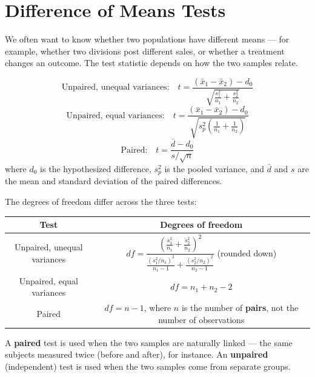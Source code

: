 \documentclass[
  11pt,
  letterpaper,
  DIV=11,
  numbers=noendperiod,
  oneside,
  open=any]{scrreprt}
\begin{document}
\section{Difference of Means Tests}\label{difference-of-means-tests}

We often want to know whether two populations have different means ---
for example, whether two divisions post different sales, or whether a
treatment changes an outcome. The test statistic depends on how the two
samples relate.

\begin{bsformula}

\[\text{Unpaired, unequal variances:} \quad t = \frac{(\bar{x}_1 - \bar{x}_2) - d_0}{\sqrt{\frac{s_1^2}{n_1} + \frac{s_2^2}{n_2}}}\]
\[\text{Unpaired, equal variances:} \quad t = \frac{(\bar{x}_1 - \bar{x}_2) - d_0}{\sqrt{s_p^2\left(\frac{1}{n_1} + \frac{1}{n_2}\right)}}\]
\[\text{Paired:} \quad t = \frac{\bar{d} - d_0}{s / \sqrt{n}}\] where
\(d_0\) is the hypothesized difference, \(s_p^2\) is the pooled
variance, and \(\bar{d}\) and \(s\) are the mean and standard deviation
of the paired differences.

The degrees of freedom differ across the three tests:

\begin{center}
\begin{tabular}{cc}
\toprule
Test & Degrees of freedom \\
\midrule
Unpaired, unequal variances & \(df = \dfrac{\left(\frac{s_1^2}{n_1} + \frac{s_2^2}{n_2}\right)^2}{\frac{(s_1^2/n_1)^2}{n_1-1} + \frac{(s_2^2/n_2)^2}{n_2-1}}\)
(rounded down) \\
Unpaired, equal variances & \(df = n_1 + n_2 - 2\) \\
Paired & \(df = n - 1\), where \(n\) is the number of \textbf{pairs}, not the
number of observations \\
\bottomrule
\end{tabular}
\end{center}

\end{bsformula}

A \textbf{paired} test is used when the two samples are naturally linked
--- the same subjects measured twice (before and after), for instance.
An \textbf{unpaired} (independent) test is used when the two samples
come from separate groups.
\end{document}
